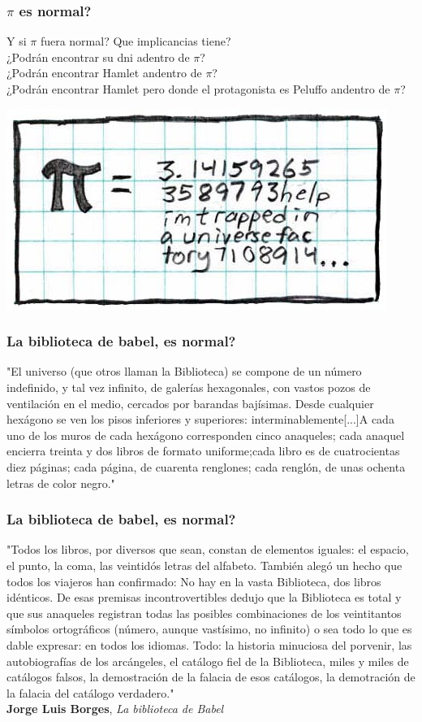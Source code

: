 \begin{frame}
\frametitle{$\pi$ es normal?}
Y si $\pi$ fuera normal? Que implicancias tiene?\\
\pause
¿Podrán encontrar su dni adentro de $\pi$?\\
¿Podrán encontrar Hamlet andentro de $\pi$?\\
¿Podrán encontrar Hamlet pero donde el protagonista es Peluffo andentro de $\pi$?\\
\pause
\begin{center}
\includegraphics[scale=0.75]{imagenes/piequals.jpg}
\end{center}
\end{frame}

\begin{frame}
\frametitle{La biblioteca de babel, es normal?}
"El universo (que otros llaman la Biblioteca) se compone de un número indefinido, y tal vez infinito, de galerías hexagonales, con vastos pozos de ventilación en el medio, cercados por barandas bajísimas. Desde cualquier hexágono se ven los pisos inferiores y superiores: interminablemente[...]A cada uno de los muros de cada hexágono corresponden cinco anaqueles; cada anaquel encierra treinta y dos libros de formato uniforme;cada libro es de cuatrocientas diez páginas; cada página, de cuarenta renglones; cada renglón, de unas ochenta letras de color negro."
\end{frame}

\begin{frame}
\frametitle{La biblioteca de babel, es normal?}
"Todos los libros, por diversos que sean, constan de elementos iguales: el espacio, el punto, la coma, las veintidós letras del alfabeto. También alegó un hecho que todos los viajeros han confirmado: No hay en la vasta Biblioteca, dos libros idénticos. De esas premisas incontrovertibles dedujo que la Biblioteca es total y que sus anaqueles registran todas las posibles combinaciones de los veintitantos símbolos ortográficos (número, aunque vastísimo, no infinito) o sea todo lo que es dable expresar: en todos los idiomas. Todo: la historia minuciosa del porvenir, las autobiografías de los arcángeles, el catálogo fiel de la Biblioteca, miles y miles de catálogos falsos, la demostración de la falacia de esos catálogos, la demotración de la falacia del catálogo verdadero."\\ \textbf{Jorge Luis Borges}, \textit{La biblioteca de Babel}
\end{frame}

